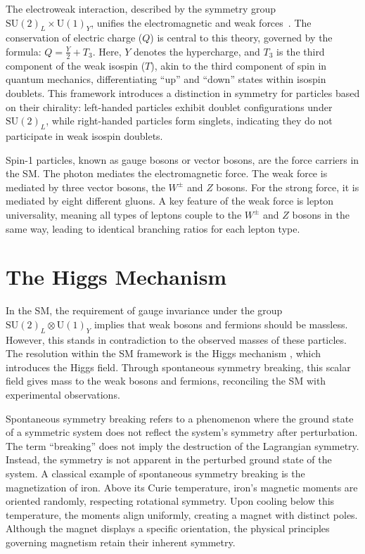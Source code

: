 The electroweak interaction, described by the symmetry group $\mathrm{SU}(2)_L \times \mathrm{U}(1)_Y$, unifies the electromagnetic and weak forces~\cite{GLASHOW1961579, PhysRev.127.965, PhysRevLett.19.1264}. The conservation of electric charge ($Q$) is central to this theory, governed by the formula: $Q = \frac{Y}{2} + T_3$. Here, $Y$ denotes the hypercharge, and $T_3$ is the third component of the weak isospin ($T$), akin to the third component of spin in quantum mechanics, differentiating ``up'' and ``down'' states within isospin doublets. This framework introduces a distinction in symmetry for particles based on their chirality: left-handed particles exhibit doublet configurations under $\mathrm{SU}(2)_L$, while right-handed particles form singlets, indicating they do not participate in weak isospin doublets. 

Spin-1 particles, known as gauge bosons or vector bosons, are the force carriers in the SM. The photon mediates the electromagnetic force. The weak force is mediated by three vector bosons, the $W^{\pm}$ and $Z$ bosons. For the strong force, it is mediated by eight different gluons. A key feature of the weak force is lepton universality, meaning all types of leptons couple to the $W^{\pm}$ and $Z$ bosons in the same way, leading to identical branching ratios for each lepton type.

\section{The Higgs Mechanism}


In the SM, the requirement of gauge invariance under the group $\mathrm{SU}(2)_L \otimes \mathrm{U}(1)_Y$ implies that weak bosons and fermions should be massless. However, this stands in contradiction to the observed masses of these particles. 
The resolution within the SM framework is the Higgs mechanism \cite{Higgs:1964ia, PhysRevLett.13.508, PhysRevLett.13.321, PhysRevLett.13.585}, which introduces the Higgs field. Through spontaneous symmetry breaking, this scalar field gives mass to the weak bosons and fermions, reconciling the SM with experimental observations.

Spontaneous symmetry breaking refers to a phenomenon where the ground state of a symmetric system does not reflect the system's symmetry after perturbation. The term ``breaking'' does not imply the destruction of the Lagrangian symmetry. Instead, the symmetry is not apparent in the perturbed ground state of the system.
A classical example of spontaneous symmetry breaking is the magnetization of iron. Above its Curie temperature, iron's magnetic moments are oriented randomly, respecting rotational symmetry. Upon cooling below this temperature, the moments align uniformly, creating a magnet with distinct poles. Although the magnet displays a specific orientation, the physical principles governing magnetism retain their inherent symmetry.

